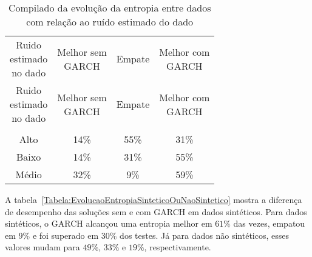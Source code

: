  \begin{center}
\begin{longtable}{cccc}
\toprule
\rowcolor{white}
 \caption{Compilado da evolução da entropia entre dados com relação ao ruído
 estimado do dado}\label{Tabela:EvolucaoEntropiaRuidoEstimado} \\
\midrule
\rowcolor{white}
   \specialcell{Ruido\\estimado\\no dado} & \specialcell{Melhor sem\\GARCH} &
   Empate & \specialcell{Melhor com\\GARCH} \\
\midrule
\endfirsthead
\midrule
\rowcolor{white}
   \specialcell{Ruido\\estimado\\no dado} & \specialcell{Melhor sem\\GARCH} &
   Empate & \specialcell{Melhor com\\GARCH} \\
\toprule
\endhead
\midrule \\ %
\endfoot
\bottomrule
\endlastfoot
    Alto  & 14\%  & 55\%  & 31\% \\
    Baixo & 14\%  & 31\%  & 55\% \\
    Médio & 32\%  & 9\%   & 59\% \\
\end{longtable}
\end{center}

A tabela~\ref{Tabela:EvolucaoEntropiaSinteticoOuNaoSintetico} mostra a
diferença de desempenho das soluções sem e com GARCH em dados sintéticos. Para dados
sintéticos, o GARCH alcançou uma entropia melhor em $61\%$ das vezes,
empatou em $9\%$ e foi superado em $30\%$ dos testes. Já para dados não
sintéticos, esses valores mudam para $49\%$, $33\%$ e $19\%$, respectivamente.

